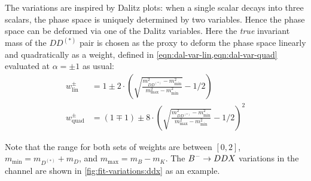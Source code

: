 The variations are inspired by Dalitz plots:
when a single scalar decays into three scalars,
the phase space is uniquely determined by two variables.
Hence the phase space can be deformed via one of the Dalitz variables.
Here the \emph{true} invariant mass of the $DD^{(*)}$ pair is chosen as the
proxy to deform the phase space linearly and quadratically
as a weight, defined in \cref{eqn:dal-var-lin,eqn:dal-var-quad} evaluated at
$\alpha = \pm 1$ as usual:
\begin{align}
    w_\text{lin}^\pm &= 1 \pm 2 \cdot
    \left(
    \sqrt{
        \frac{m_{DD^{(*)}}^2 - m_\text{min}^2}{m_\text{max}^2 - m_\text{min}^2}
    } - 1/2
    \right)
    \label{eqn:dal-var-lin} \\
    w_\text{quad}^\pm &= (1 \mp 1) \pm 8 \cdot
    \left(
    \sqrt{
        \frac{m_{DD^{(*)}}^2 - m_\text{min}^2}{m_\text{max}^2 - m_\text{min}^2}
    } - 1/2
    \right)^2
    \label{eqn:dal-var-quad}
\end{align}

Note that the range for both sets of weights are between $[0, 2]$,
$m_\text{min} = m_{D^{(*)}} + m_D$, and $m_\text{max} = m_B - m_K$.
The ${{{B}^-}} \rightarrow DDX$ variations in the \Dz channel are shown in
\cref{fig:fit-variations:ddx} as an example.

